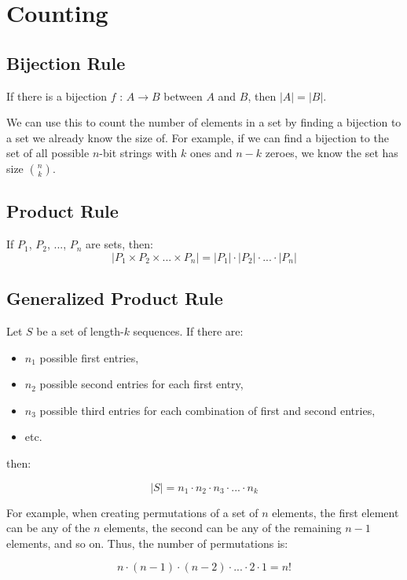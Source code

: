 \documentclass[../main.tex]{subfiles}
\begin{document}
\section{Counting}

\subsection{Bijection Rule}

If there is a bijection $f$ : $A \to B$ between $A$ and $B$, then $\lvert A \rvert = \lvert B \rvert$.

We can use this to count the number of elements in a set by finding a bijection to a set we already know the size of. For example, if we can find a bijection to the set of all possible $n$-bit strings with $k$ ones and $n-k$ zeroes, we know the set has size $\binom{n}{k}$.

\subsection{Product Rule}

If $P_1$, $P_2$, ..., $P_n$ are sets, then: 
$$
\lvert P_1 \times P_2 \times ... \times P_n \rvert = \lvert P_1 \rvert \cdot \lvert P_2 \rvert \cdot ... \cdot \lvert P_n \rvert
$$

\subsection{Generalized Product Rule}

Let $S$ be a set of length-$k$ sequences. If there are:
\begin{itemize}
  \item $n_1$ possible first entries,
  \item $n_2$ possible second entries for each first entry,
  \item $n_3$ possible third entries for each combination of first and second entries,
  \item etc.
\end{itemize}

then:

$$
\lvert S \rvert = n_1 \cdot n_2 \cdot n_3 \cdot ... \cdot n_k
$$

For example, when creating permutations of a set of $n$ elements, the first element can be any of the $n$ elements, the second can be any of the remaining $n-1$ elements, and so on. Thus, the number of permutations is:

$$
n \cdot (n-1) \cdot (n-2) \cdot ... \cdot 2 \cdot 1 = n!
$$
\end{document}
